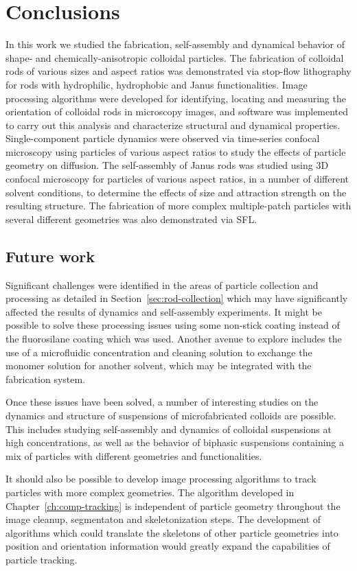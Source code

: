 \chapter{Conclusions}
\label{ch:conclusions}

In this work we studied the fabrication, self-assembly and dynamical behavior
of shape- and chemically-anisotropic colloidal particles.  The fabrication 
of colloidal rods of various sizes and aspect ratios was demonstrated via
stop-flow lithography for rods with
hydrophilic, hydrophobic and Janus functionalities.  Image processing algorithms
were developed for identifying, locating and measuring the orientation of 
colloidal rods in microscopy images, and software was implemented to carry out
this analysis and characterize structural and dynamical properties.
Single-component particle 
dynamics were observed via time-series confocal microscopy using particles of 
various aspect ratios to study the effects of particle geometry on diffusion.
The self-assembly of Janus rods was studied using
3D confocal microscopy for particles of various aspect ratios,
in a number of different solvent conditions, to determine the effects of size 
and attraction strength on the resulting structure.  The fabrication of more complex
multiple-patch particles with several different geometries was also demonstrated via SFL.

\section{Future work}

Significant challenges were identified in the areas of particle collection and processing as 
detailed in Section~\ref{sec:rod-collection} which may have significantly affected the 
results of dynamics and self-assembly experiments.  It might be possible to solve these
processing issues using some non-stick coating instead of the fluorosilane coating 
which was used.  Another avenue to explore includes the use of a microfluidic concentration
and cleaning solution to exchange the monomer solution for another solvent, 
which may be integrated with the fabrication system.  

Once these issues have been solved, a number of interesting studies on the dynamics and
structure of suspensions of microfabricated colloids are possible.  This includes studying 
self-assembly and dynamics of colloidal suspensions at high concentrations, as well as 
the behavior of biphasic suspensions containing a mix of particles with different geometries and
functionalities.

It should also be possible to develop image processing algorithms to track particles with more
complex geometries.  The algorithm developed in Chapter~\ref{ch:comp-tracking} is independent 
of particle geometry throughout the image cleanup, segmentaton and skeletonization steps.
The development of algorithms which could translate the skeletons of other particle 
geometries into position and orientation information would greatly expand the 
capabilities of particle tracking.
